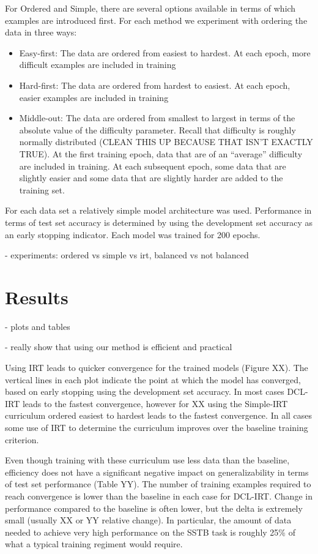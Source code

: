 \documentclass[letterpaper]{article} %
\begin{document}
For Ordered and Simple, there are several options available in terms of which examples are introduced first.
For each method we experiment with ordering the data in three ways:
\begin{itemize}
	\item 
	Easy-first: The data are ordered from easiest to hardest. At each epoch, more difficult examples are included in training
	\item 
	Hard-first: The data are ordered from hardest to easiest. At each epoch, easier examples are included in training
	\item 
	Middle-out: The data are ordered from smallest to largest in terms of the absolute value of the difficulty parameter. Recall that difficulty is roughly normally distributed (CLEAN THIS UP BECAUSE THAT ISN'T EXACTLY TRUE). At the first training epoch, data that are of an ``average'' difficulty are included in training. At each subsequent epoch, some data that are slightly easier and some data that are slightly harder are added to the training set.
\end{itemize}

For each data set a relatively simple model architecture was used.
Performance in terms of test set accuracy is determined by using the development set accuracy as an early stopping indicator.
Each model was trained for 200 epochs. 

- experiments: ordered vs simple vs irt, balanced vs not balanced 

\section{Results} 

- plots and tables 

- really show that using our method is efficient and practical 

Using IRT leads to quicker convergence for the trained models (Figure XX).
The vertical lines in each plot indicate the point at which the model has converged, based on early stopping using the development set accuracy.
In most cases DCL-IRT leads to the fastest convergence, however for XX using the Simple-IRT curriculum ordered easiest to hardest leads to the fastest convergence.
In all cases some use of IRT to determine the curriculum improves over the baseline training criterion. 

Even though training with these curriculum use less data than the baseline, efficiency does not have a significant negative impact on generalizability in terms of test set performance (Table YY).
The number of training examples required to reach convergence is lower than the baseline in each case for DCL-IRT.
Change in performance compared to the baseline is often lower, but the delta is extremely small (usually XX or YY relative change). 
In particular, the amount of data needed to achieve very high performance on the SSTB task is roughly 25\% of what a typical training regiment would require.
\end{document}
